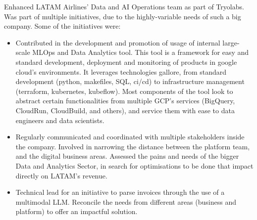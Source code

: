 \documentclass[10pt,a4paper,ragged2e,withhyper]{altacv}
\begin{document}
\begin{paracol}{2}
\bigskip



\nocite{*}



\printbibliography[heading=pubtype,title={\printinfo{\faUsers}{Conference Proceedings}},type=inproceedings]

\printbibliography[heading=pubtype,title={\printinfo{\faUsers}{Thesis}},type=proceedings]

\bigskip



\divider

\divider


\bigskip






\newpage



Enhanced LATAM Airlines' Data and AI Operations team as part of Tryolabs. Was part of multiple initiatives, due to the highly-variable needs of such a big company. Some of the initiatives were:

\begin{itemize}
    \item Contributed in the development and promotion of usage of internal large-scale MLOps and Data Analytics tool. This tool is a framework for easy and standard development, deployment and monitoring of products in google cloud's environments. It leverages technologies gallore, from standard development (python, makefiles, SQL, ci/cd) to infrastructure management (terraform, kubernetes, kubeflow). Most components of the tool look to abstract certain functionalities from multiple GCP's services (BigQuery, CloudRun, CloudBuild, and others), and service them with ease to data engineers and data scientists.
    \item Regularly communicated and coordinated with multiple stakeholders inside the company. Involved in narrowing the distance between the platform team, and the digital business areas. Assessed the pains and needs of the bigger Data and Analytics Sector, in search for optimisations to be done that impact directly on LATAM's revenue.
    \item Technical lead for an initiative to parse invoices through the use of a multimodal LLM. Reconcile the needs from different areas (business and platform) to offer an impactful solution.
\end{itemize}


\end{paracol}
\end{document}
